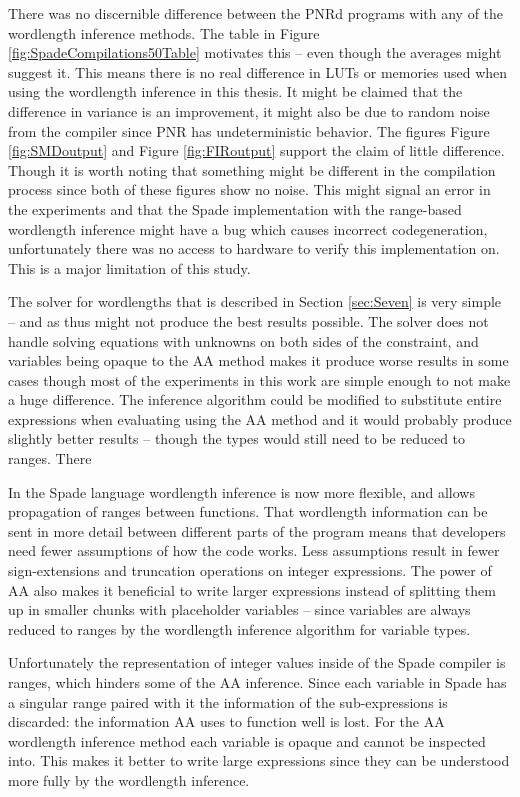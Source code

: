 There was no discernible difference between the PNRd programs with any of the wordlength inference methods. The table in Figure \ref{fig:SpadeCompilations50Table} motivates this -- even though the averages might suggest it. This means there is no real difference in LUTs or memories used when using the wordlength inference in this thesis. It might be claimed that the difference in variance is an improvement, it might also be due to random noise from the compiler since PNR has undeterministic behavior. The figures Figure \ref{fig:SMDoutput} and Figure \ref{fig:FIRoutput} support the claim of little difference. Though it is worth noting that something might be different in the compilation process since both of these figures show no noise. This might signal an error in the experiments and that the Spade implementation with the range-based wordlength inference might have a bug which causes incorrect codegeneration, unfortunately there was no access to hardware to verify this implementation on. This is a major limitation of this study.

The solver for wordlengths that is described in Section \ref{sec:Seven} is very simple -- and as thus might not produce the best results possible. The solver does not handle solving equations with unknowns on both sides of the constraint, and variables being opaque to the AA method makes it produce worse results in some cases though most of the experiments in this work are simple enough to not make a huge difference. The inference algorithm could be modified to substitute entire expressions when evaluating using the AA method and it would probably produce slightly better results -- though the types would still need to be reduced to ranges. There

In the Spade language wordlength inference is now more flexible, and allows propagation of ranges between functions. That wordlength information can be sent in more detail between different parts of the program means that developers need fewer assumptions of how the code works. Less assumptions result in fewer sign-extensions and truncation operations on integer expressions. The power of AA also makes it beneficial to write larger expressions instead of splitting them up in smaller chunks with placeholder variables -- since variables are always reduced to ranges by the wordlength inference algorithm for variable types.

Unfortunately the representation of integer values inside of the Spade compiler is ranges, which hinders some of the AA inference. Since each variable in Spade has a singular range paired with it the information of the sub-expressions is discarded: the information AA uses to function well is lost. For the AA wordlength inference method each variable is opaque and cannot be inspected into. This makes it better to write large expressions since they can be understood more fully by the wordlength inference.

